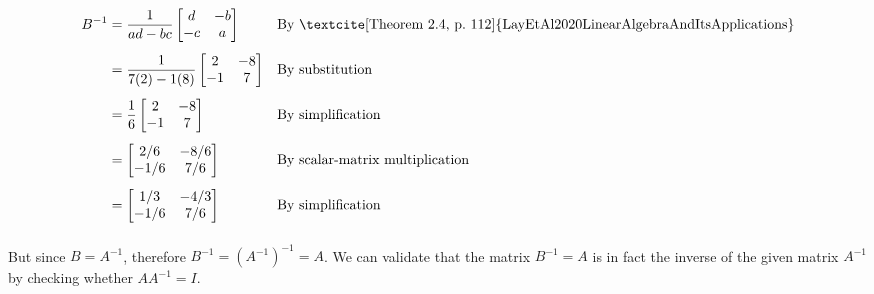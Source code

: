 \documentclass[10pt,letterpaper,final]{report}
\newcommand{\reason}[1]{&& \text{#1}}
\begin{document}
\begin{align*}
  B^{-1} & = \frac{1}{ad - bc}\begin{bmatrix}
                                d  & -b \\
                                -c & a
                              \end{bmatrix}     \reason{By \textcite[Theorem~2.4, p.~112]{LayEtAl2020LinearAlgebraAndItsApplications}} \\[1ex]
         & = \frac{1}{7(2) - 1(8)}\begin{bmatrix}
                                    2  & -8 \\
                                    -1 & 7
                                  \end{bmatrix} \reason{By substitution}                                                               \\[1ex]
         & = \frac{1}{6}\begin{bmatrix}
                          2  & -8 \\
                          -1 & 7
                        \end{bmatrix}           \reason{By simplification}                                                             \\[1ex]
         & = \begin{bmatrix}
               2/6  & -8/6 \\
               -1/6 & 7/6
             \end{bmatrix}                      \reason{By scalar-matrix multiplication}                                               \\[1ex]
         & = \begin{bmatrix}
               1/3  & -4/3 \\
               -1/6 & 7/6
             \end{bmatrix}                      \reason{By simplification}                                                             \\[1ex]
\end{align*}

But since $B = A^{-1}$, therefore $B^{-1} = (A^{-1})^{-1} = A$. We can validate that the matrix $B^{-1} = A$ is in fact the inverse of the given matrix $A^{-1}$ by checking whether $AA^{-1} = I$.
\end{document}
